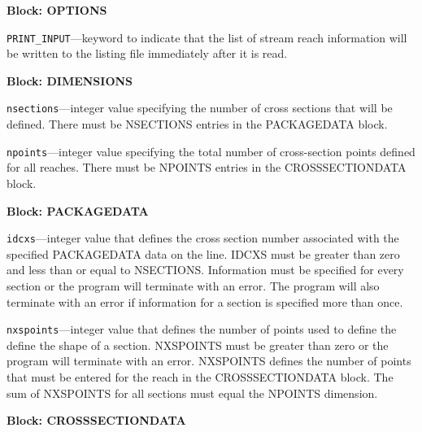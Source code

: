 
\item \textbf{Block: OPTIONS}

\begin{description}
\item \texttt{PRINT\_INPUT}---keyword to indicate that the list of stream reach information will be written to the listing file immediately after it is read.

\end{description}
\item \textbf{Block: DIMENSIONS}

\begin{description}
\item \texttt{nsections}---integer value specifying the number of cross sections that will be defined.  There must be NSECTIONS entries in the PACKAGEDATA block.

\item \texttt{npoints}---integer value specifying the total number of cross-section points defined for all reaches.  There must be NPOINTS entries in the CROSSSECTIONDATA block.

\end{description}
\item \textbf{Block: PACKAGEDATA}

\begin{description}
\item \texttt{idcxs}---integer value that defines the cross section number associated with the specified PACKAGEDATA data on the line. IDCXS must be greater than zero and less than or equal to NSECTIONS. Information must be specified for every section or the program will terminate with an error.  The program will also terminate with an error if information for a section is specified more than once.

\item \texttt{nxspoints}---integer value that defines the number of points used to define the define the shape of a section.  NXSPOINTS must be greater than zero or the program will terminate with an error.  NXSPOINTS defines the number of points that must be entered for the reach in the CROSSSECTIONDATA block.  The sum of NXSPOINTS for all sections must equal the NPOINTS dimension.

\end{description}
\item \textbf{Block: CROSSSECTIONDATA}

